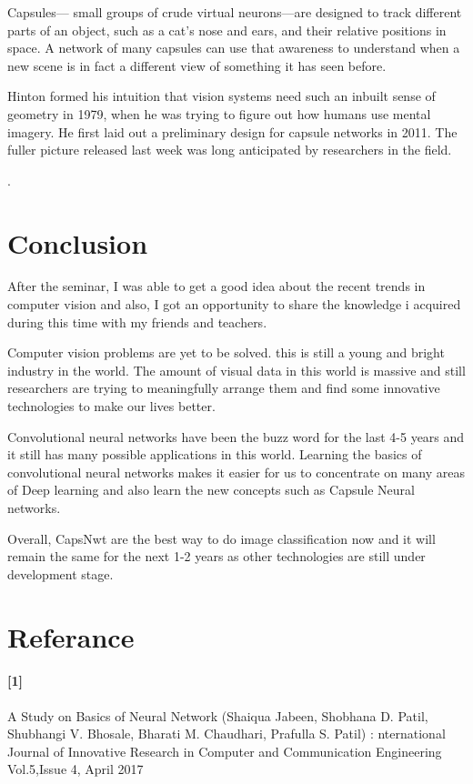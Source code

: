 \documentclass[12pt]{article}
\begin{document}
Capsules— small groups of crude virtual neurons—are designed to track different parts of an object, such as a cat’s nose and ears, and their relative positions in space. A network of many capsules can use that awareness to understand when a new scene is in fact a different view of something it has seen before.

Hinton formed his intuition that vision systems need such an inbuilt sense of geometry in 1979, when he was trying to figure out how humans use mental imagery. He first laid out a preliminary design for capsule networks in 2011. The fuller picture released last week was long anticipated by researchers in the field. 

\newpage
.%
\vspace{35mm}
\section*{\fontsize{14}{14}\selectfont Conclusion}

After the seminar, I was able to get a good idea about the recent trends in computer vision and also, I got an opportunity to share the knowledge i acquired during this time with my friends and teachers.

Computer vision problems are yet to be solved. this is still a young and bright industry in the world. The amount of visual data in this world is massive and still researchers are trying to meaningfully arrange them and find some innovative technologies to make our lives better. 

Convolutional neural networks have been the buzz word for the last 4-5 years and it still has many possible applications in this world. Learning the basics of convolutional neural networks makes it easier for us to concentrate on many areas of Deep learning and also learn the new concepts such as Capsule Neural networks.

Overall, CapsNwt are the best way to do image classification now and it will remain the same for the next 1-2 years as other technologies are still under development stage.

\newpage
\section*{\fontsize{14}{14}\selectfont Referance}
\paragraph*{[1]}
A Study on Basics of Neural Network (Shaiqua Jabeen, Shobhana D. Patil, Shubhangi V. Bhosale, Bharati M. Chaudhari, Prafulla S. Patil) : nternational Journal of Innovative Research in Computer and Communication Engineering Vol.5,Issue 4, April 2017
\end{document}
